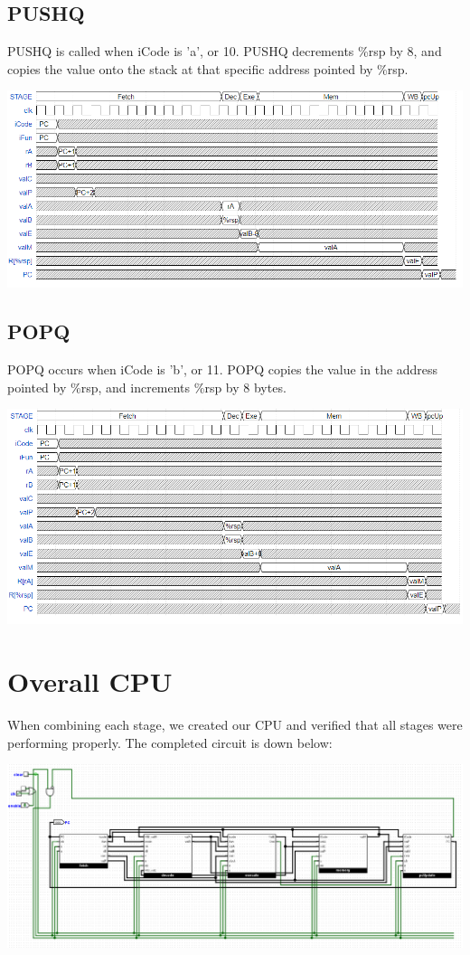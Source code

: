 \documentclass{article}
\begin{document}
\subsection{PUSHQ}
PUSHQ is called when iCode is 'a', or 10. PUSHQ decrements \%rsp by 8, and copies the value onto the stack at that specific address pointed by \%rsp. 
\begin{center}
    \includegraphics[scale=.6]{PUSHQpic.png}
\end{center}
\subsection{POPQ}
POPQ occurs when iCode is 'b', or 11. POPQ copies the value in the address pointed by \%rsp, and increments \%rsp by 8 bytes. 
\begin{center}
    \includegraphics[scale=.6]{POPQpic.png}
\end{center}
\section{Overall CPU}
When combining each stage, we created our CPU and verified that all stages were performing properly. The completed circuit is down below:
\begin{center}
    \includegraphics[scale=.35]{mainCPU.png}
\end{center}
\end{document}
